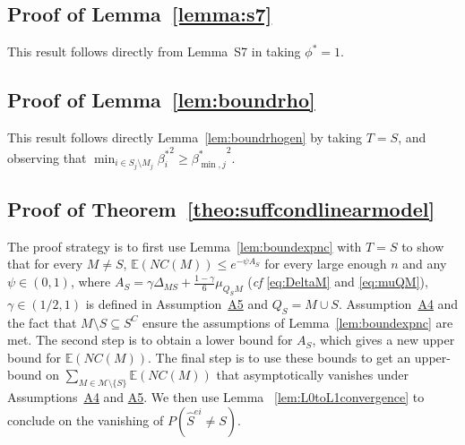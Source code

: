 \documentclass[
  12pt]{article}
\newcommand{\E}{\mathbb{E}}
\newcommand{\M}{\mathcal{M}}
\begin{document}
\subsection{Proof of Lemma~\ref{lemma:s7}}
    This result follows directly from Lemma~S7 in \cite{rossell2022concentration} taking $\phi^*=1$.

\subsection{Proof of Lemma~\ref{lem:boundrho}}
This result follows directly Lemma~\ref{lem:boundrhogen} by taking $T=S$, and observing that $\min_{i\in S_j\setminus M_j}{\beta^*_i}^2\geq {\beta^*_{\min,j}}^2$.

\subsection{Proof of Theorem~\ref{theo:suffcondlinearmodel}} 
The proof strategy is to first use Lemma~\ref{lem:boundexpnc} with $T=S$ to show that for every $M\neq S$, $\E(NC(M)) \leq e^{-\psi A_S}$ for every large enough $n$ and any $\psi \in (0,1)$, where $A_S=\gamma\Delta_{MS}+\tfrac{1-\gamma}{6}\mu_{Q_SM}$ (\emph{cf} \eqref{eq:DeltaM} and \eqref{eq:muQM}), $\gamma\in(1/2,1)$ is defined in Assumption~\hyperlink{lab:A5}{A5} and $Q_S= M\cup S$. Assumption~\hyperlink{lab:A4}{A4} and the fact that $M\setminus S\subseteq S^C$ ensure the 
assumptions of Lemma~\ref{lem:boundexpnc} are met. 
The second step is to obtain a lower bound for $A_S$, which gives a new upper bound for $\E(NC(M))$.
The final step is to use these bounds to get an upper-bound on $\sum_{M \in \M\setminus \{S\}} \E\left(NC(M)\right)$ that asymptotically vanishes under Assumptions~\hyperlink{lab:A4}{A4} and \hyperlink{lab:A5}{A5}. We then use Lemma~ \ref{lem:L0toL1convergence} to conclude on the vanishing of $P(\hat{S}^{ei} \neq S)$. 
\end{document}
